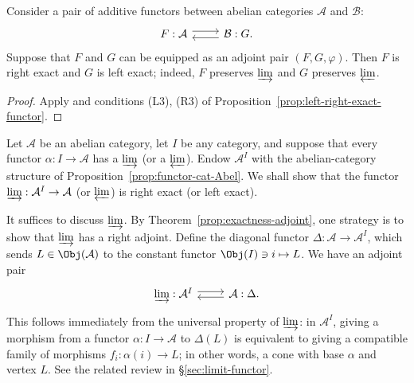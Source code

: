 \begin{theorem}\label{prop:exactness-adjoint}
Consider a pair of additive functors between abelian categories $\mathcal{A}$
and $\mathcal{B}$:
\[\begin{tikzcd}
	F: \mathcal{A} \arrow[r, yshift=0.3em] & \mathcal{B} :G \arrow[l, yshift=-0.3em] .
\end{tikzcd}\]
Suppose that $F$ and $G$ can be equipped as an adjoint pair $(F,G,\varphi)$.
Then $F$ is right exact and $G$ is left exact; indeed, $F$ preserves
$\varinjlim$ and $G$ preserves $\varprojlim$.
\end{theorem}

\begin{proof}
Apply \cite[Theorem 2.8.12]{Li1} and conditions (L3), (R3) of
Proposition~\ref{prop:left-right-exact-functor}.
\end{proof}

\begin{example}\label{eg:limit-exactness}
Let $\mathcal{A}$ be an abelian category, let $I$ be any category, and suppose
that every functor $\alpha:I\to\mathcal{A}$ has a $\varinjlim$ (or a
$\varprojlim$). Endow $\mathcal{A}^I$ with the abelian-category structure of
Proposition~\ref{prop:functor-cat-Abel}. We shall show that the functor
$\varinjlim:\mathcal{A}^I\to\mathcal{A}$ (or $\varprojlim$) is right exact (or
left exact).

It suffices to discuss $\varinjlim$. By
Theorem~\ref{prop:exactness-adjoint}, one strategy is to show that
$\varinjlim$ has a right adjoint. Define the diagonal functor
$\Delta:\mathcal{A}\to\mathcal{A}^I$, which sends $L\in\Obj(\mathcal{A})$ to
the constant functor $\Obj(I)\ni i\mapsto L$. We have an adjoint pair
\[\begin{tikzcd}
	\varinjlim : \mathcal{A}^I \arrow[shift left, r] & \mathcal{A}: \Delta \arrow[l, shift left] .
\end{tikzcd}\]
This follows immediately from the universal property of $\varinjlim$: in
$\mathcal{A}^I$, giving a morphism from a functor
$\alpha:I\to\mathcal{A}$ to $\Delta(L)$ is equivalent to giving a compatible
family of morphisms $f_i:\alpha(i)\to L$; in other words, a cone with base
$\alpha$ and vertex $L$. See the related review in
\S\ref{sec:limit-functor}.
\end{example}


